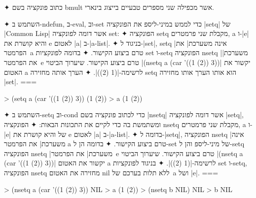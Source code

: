 \begin{enumerate}
  ✦ כתוב פונקציה בשם bmult אשר מכפילה שני מספרים טבעיים בייצוג בינארי.

  ✦ השתמש ב-ndefun, ב-eval, וב-set כדי לממש במיני-ליספ את הפונקציה \E|setq| של
  \E|Common Lisp| אשר דומה לפונקציה set:
  ✦ הפונקציה setq מקבלת שני פרמטרים, a ו-\E|e| והיא קושרת את e לאטום \E|a|
  ב-\E|a-list|.
  ✦ בניגוד ל-\E|set|, setq \ע|אינה משערכת| את הפרמטר~a טרם ביצוע הקישור.
  ✦ בדומה לפונקציות set ו-setq הפונקציה nsetq \ע|משערכת| את הפרמטר~e טרם ביצוע
  הקישור. שיערוך הביטוי \T|(nsetq a (car '((1 (2)) 3))| יקשור את האטום a
  לרשימה-\T|(1 (2))|.
  ✦ הערך אותה מחזירה setq הוא אותו הערך אותו מחזירה \E|set|.
===
  \begin{LISP}
> (setq a (car '((1 (2)) 3))
(1 (2))
> a
(1 (2))
\end{LISP}

  ✦ השתמש ב-setq וב-cond כדי לכתוב פונקציה בשם \E|nsetq| אשר דומה לפונקציה
  \E|setq|, ומשתמשת בה כדי לקיים את התכונות הבאות:
  ✦ הפונקציה nsetq מקבלת שני פרמטרים, a ו-\E|e| של והיא קושרת את e לאטום \E|a|
  ב-\E|a-list|.
  ✦ בדומה ל-\E|setq|, הפונקציה nsetq \ע|אינה משערכת| את הפרמטר a טרם ביצוע
  הקישור.
  ✦ בדומה הן ל-set של מיני-ליספ והן ל-setq הפונקציה nsetq \ע|משערכת| את
  הפרמטר~e טרם ביצוע הקישור. שיערוך הביטוי \T|(nsetq a (car '((1 (2)) 3))|
  יקשור את האטום a לרשימה-\T|(1 (2))|.
  ✦ בניגוד לפונקציות set ו-setq, הפונקציה nsetq מחזירה את האטום nil ללא תלות
  בערכם של~a ושל \E|e|.
===
  \begin{LISP}
> (nsetq a (car '((1 (2)) 3))
NIL
> a
(1 (2))
> (nsetq b NIL)
NIL
> b
NIL
\end{LISP}
\end{enumerate}
